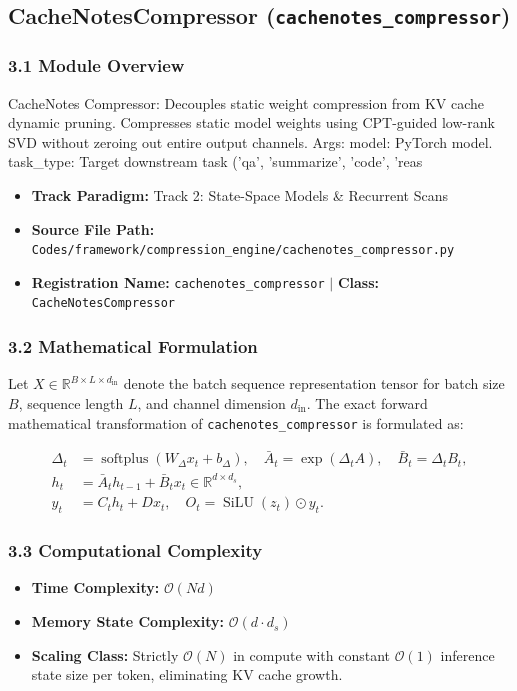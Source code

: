 \subsection{CacheNotesCompressor (\texttt{cachenotes\_compressor})}
\label{sec:app_module_cachenotes_compressor}

\subsubsection*{3.1 Module Overview}
CacheNotes Compressor: Decouples static weight compression from KV cache dynamic pruning. Compresses static model weights using CPT-guided low-rank SVD without zeroing out entire output channels.  Args:     model: PyTorch model.     task\_type: Target downstream task ('qa', 'summarize', 'code', 'reas
\begin{itemize}
    \item \textbf{Track Paradigm:} Track 2: State-Space Models & Recurrent Scans
    \item \textbf{Source File Path:} \texttt{Codes/framework/compression\_engine/cachenotes\_compressor.py}
    \item \textbf{Registration Name:} \texttt{cachenotes\_compressor} $\mid$ \textbf{Class:} \texttt{CacheNotesCompressor}
\end{itemize}

\subsubsection*{3.2 Mathematical Formulation}
Let $X \in \mathbb{R}^{B \times L \times d_{\text{in}}}$ denote the batch sequence representation tensor for batch size $B$, sequence length $L$, and channel dimension $d_{\text{in}}$. The exact forward mathematical transformation of \texttt{cachenotes\_compressor} is formulated as:

\begin{align}
\Delta_t &= \operatorname{softplus}(W_\Delta x_t + b_\Delta), \quad \bar{A}_t = \exp(\Delta_t A), \quad \bar{B}_t = \Delta_t B_t, \\
h_t &= \bar{A}_t h_{t-1} + \bar{B}_t x_t \in \mathbb{R}^{d \times d_s}, \\
y_t &= C_t h_t + D x_t, \quad O_t = \operatorname{SiLU}(z_t) \odot y_t.
\end{align}


\subsubsection*{3.3 Computational Complexity}
\begin{itemize}
    \item \textbf{Time Complexity:} $\mathcal{O}(N d)$
    \item \textbf{Memory State Complexity:} $\mathcal{O}(d \cdot d_s)$
    \item \textbf{Scaling Class:} Strictly $\mathcal{O}(N)$ in compute with constant $\mathcal{O}(1)$ inference state size per token, eliminating KV cache growth.
\end{itemize}

